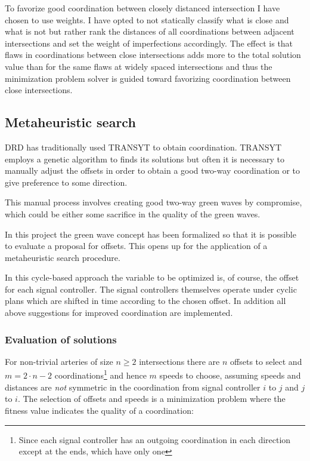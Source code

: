 To favorize good coordination between closely distanced intersection I have chosen to use weights.  I have opted to not statically classify what is close and what is not but rather rank the distances of all coordinations between adjacent intersections and set the weight of imperfections accordingly. The effect is that flaws in coordinations between close intersections adds more to the total solution value than for the same flaws at widely spaced intersections and thus the minimization problem solver is guided toward favorizing coordination between close intersections.

\subsection{Metaheuristic search}
DRD has traditionally used TRANSYT to obtain coordination. TRANSYT employs a genetic algorithm to finds its solutions but often it is necessary to manually adjust the offsets in order to obtain a good two-way coordination or to give preference to some direction. 

This manual process involves creating good two-way green waves by compromise, which could be either some sacrifice in the quality of the green waves. 

In this project the green wave concept has been formalized so that it is possible to evaluate a proposal for offsets. This opens up for the application of a metaheuristic search procedure.

In this cycle-based approach the variable to be optimized is, of course, the offset for each signal controller. The signal controllers themselves operate under cyclic plans which are shifted in time according to the chosen offset. In addition all above suggestions for improved coordination are implemented.

\subsubsection*{Evaluation of solutions}
\label{eval_coord}
For non-trivial arteries of size $n \geq 2$ intersections there are $n$ offsets to select and $m = 2 \cdot n - 2$ coordinations\footnote{Since each signal controller has an outgoing coordination in each direction except at the ends, which have only one} and hence $m$ speeds to choose, assuming speeds and distances are \textit{not} symmetric in the coordination from signal controller $i$ to $j$ and $j$ to $i$.
The selection of offsets and speeds is a minimization problem where the fitness value indicates the quality of a coordination:

